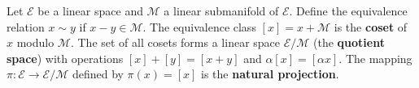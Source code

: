 Let $\mathcal{E}$ be a linear space and $\mathcal{M}$ a linear submanifold of $\mathcal{E}$. Define the equivalence relation $x \sim y$ if $x - y \in \mathcal{M}$. The equivalence class $[x] = x + \mathcal{M}$ is the \textbf{coset} of $x$ modulo $\mathcal{M}$. The set of all cosets forms a linear space $\mathcal{E} / \mathcal{M}$ (the \textbf{quotient space}) with operations $[x] + [y] = [x + y]$ and $\alpha[x] = [\alpha x]$. The mapping $\pi : \mathcal{E} \to \mathcal{E} / \mathcal{M}$ defined by $\pi(x) = [x]$ is the \textbf{natural projection}.
